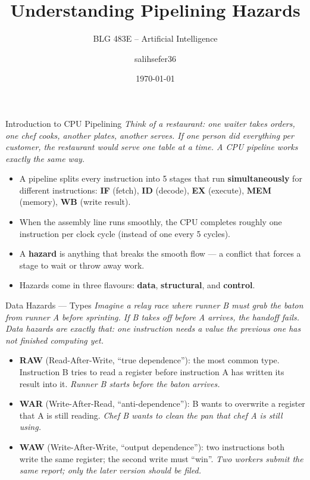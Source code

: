 \documentclass{beamer}
\title{Understanding Pipelining Hazards}
\subtitle{BLG 483E -- Artificial Intelligence}
\author{salihsefer36}
\date{\today}
\begin{document}
\begin{frame}
  \titlepage
\end{frame}

\begin{frame}{Introduction to CPU Pipelining}
  \textit{Think of a restaurant: one waiter takes orders, one chef cooks,
  another plates, another serves. If one person did everything per customer,
  the restaurant would serve one table at a time. A CPU pipeline works
  exactly the same way.}

  \medskip
  \begin{itemize}
    \item A pipeline splits every instruction into 5 stages that run
          \textbf{simultaneously} for different instructions:
          \textbf{IF} (fetch), \textbf{ID} (decode), \textbf{EX} (execute),
          \textbf{MEM} (memory), \textbf{WB} (write result).
    \item When the assembly line runs smoothly, the CPU completes roughly
          one instruction per clock cycle (instead of one every 5 cycles).
    \item A \textbf{hazard} is anything that breaks the smooth flow ---
          a conflict that forces a stage to wait or throw away work.
    \item Hazards come in three flavours: \textbf{data}, \textbf{structural},
          and \textbf{control}.
  \end{itemize}
\end{frame}

\begin{frame}{Data Hazards --- Types}
  \textit{Imagine a relay race where runner B must grab the baton from runner A
  before sprinting. If B takes off before A arrives, the handoff fails.
  Data hazards are exactly that: one instruction needs a value the previous
  one has not finished computing yet.}

  \medskip
  \begin{itemize}
    \item \textbf{RAW} (Read-After-Write, ``true dependence''): the most common
          type. Instruction B tries to read a register before instruction A has
          written its result into it. \textit{Runner B starts before the baton
          arrives.}
    \item \textbf{WAR} (Write-After-Read, ``anti-dependence''): B wants to
          overwrite a register that A is still reading. \textit{Chef B wants to
          clean the pan that chef A is still using.}
    \item \textbf{WAW} (Write-After-Write, ``output dependence''): two
          instructions both write the same register; the second write must
          ``win''. \textit{Two workers submit the same report; only the later
          version should be filed.}
  \end{itemize}
\end{frame}
\end{document}
